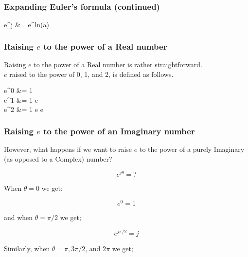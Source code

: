 \documentclass[aspectratio=169, final]{beamer}
\begin{document}
\begin{frame}[t]

	\frametitle{Expanding Euler's formula (continued)}

	\begin{flalign} \label{eqn_frame_2_d}
	e^{j\theta} &= e^{ln(a)\sigma}
	\end{flalign}

\end{frame}



\begin{frame}[t]

	\frametitle{Raising \(e\) to the power of a Real number}

	Raising \(e\) to the power of a Real number is rather straightforward.\\

	\(e\) raised to the power of 0, 1, and 2, is defined as follows.

	\begin{flalign} \label{eqn_frame_3_a}
	e^{0} &= 1   \\
	e^{1} &= 1 \times e   \\
	e^{2} &= 1 \times e \times e
	\end{flalign}

\end{frame}



\begin{frame}[t]

	\frametitle{Raising \(e\) to the power of an Imaginary number}

	However, what happens if we want to raise \(e\) to the power of a purely Imaginary (as opposed to a Complex) number?

	\begin{equation} \label{eqn_frame_3_a}
	e^{j\theta} = ?
	\end{equation}

	When \(\theta = 0\) we get;

	\begin{equation} \label{eqn_frame_3_b}
	e^{0} = 1
	\end{equation}

	and when \(\theta = \pi/2\) we get;

	\begin{equation} \label{eqn_frame_3_c}
	e^{j\pi/2} = j
	\end{equation}

	Similarly, when \(\theta = \pi, 3\pi/2\), and \(2\pi\) we get;

\end{frame}
\end{document}
